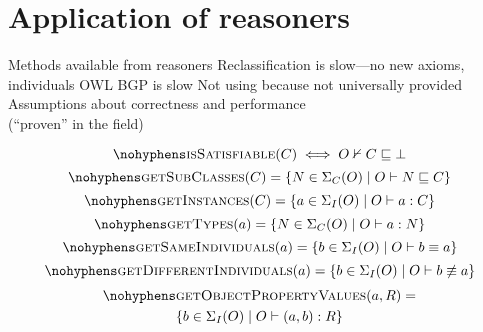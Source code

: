 \documentclass[paper.tex]{subfiles}
\begin{document}
\section{Application of reasoners}
\label{sec:reasoners}

\begin{todos}
  \todo Methods available from reasoners
  \todo Reclassification is slow---no new axioms, individuals
  \todo OWL BGP is slow
  \todo Not using  because not universally provided
  \todo Assumptions about correctness and performance \\(``proven'' in the field)
\end{todos}

\todo[in ontology $O$]

\[ \textproc{isSatisfiable}(C) \iff O \nsementails C \sqsubseteq \bot \]
\[ \textproc{getSubClasses}(C) = \{ N \in \signature_C(O) \mid O \sementails N \sqsubseteq C \} \]
\[ \textproc{getInstances}(C) = \{ a \in \signature_I(O) \mid O \sementails a : C \} \]
\[ \textproc{getTypes}(a) = \{ N \in \signature_C(O) \mid O \sementails a : N \} \]
\[ \textproc{getSameIndividuals}(a) = \{ b \in \signature_I(O) \mid O \sementails b \equiv a \} \]
\[ \textproc{getDifferentIndividuals}(a) = \{ b \in \signature_I(O) \mid O \sementails b \not\equiv a \} \]
\begin{multline*}
  \textproc{getObjectPropertyValues}(a, R) = \\
  \{ b \in \signature_I(O) \mid O \sementails (a, b) : R \}
\end{multline*}

\end{document}
